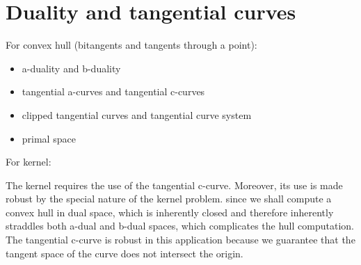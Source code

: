 \documentclass[12pt]{article}
\newif\ifTalk
\begin{document}




\ifTalk
We can interpret our algorithm as a tangent sweep (a sweep through tangent space),
a smooth version of line sweep.

In our sweep, we sweep a line controlled by the curve's tangent space,
where events are defined by bitangents (intersections in dual space).
In fact, we can avoid a physical sweep (just appealing to its structure)
and get its effects from a sorting of bitangent parameter values.
\fi

\clearpage


\section{Duality and tangential curves}
\label{sec:duality}

For convex hull (bitangents and tangents through a point):

\begin{itemize}
\item	a-duality and b-duality
\item	tangential a-curves and tangential c-curves
\item	clipped tangential curves and tangential curve system
\item   primal space
\end{itemize}

For kernel:

The kernel requires the use of the tangential c-curve.
Moreover, its use is made robust by the special nature of the kernel problem.
since we shall compute a convex hull in dual space, which is inherently
closed and therefore inherently straddles both a-dual and b-dual spaces,
which complicates the hull computation.
The tangential c-curve is robust in this application because
we guarantee that the tangent space of the curve does not intersect the origin.
\end{document}
